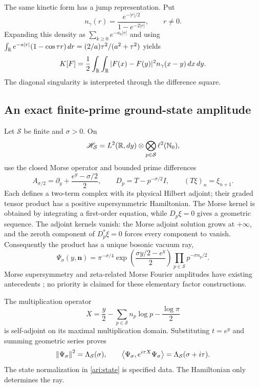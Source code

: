 The same kinetic form has a jump representation. Put
\[
n_\gamma(r)=\frac{e^{-|r|/2}}{1-e^{-2|r|}},\qquad r\ne0.
\]
Expanding this density as $\sum_{k\ge0}e^{-a_k|r|}$ and using
$\int_{\mathbb R}e^{-a|r|}(1-\cos\tau r)\,dr=(2/a)\tau^2/(a^2+\tau^2)$ yields
\begin{equation}\label{ari:gamma-jump}
K[F]=\frac12\int_{\mathbb R}\int_{\mathbb R}|F(x)-F(y)|^2n_\gamma(x-y)\,dx\,dy.
\end{equation}
The diagonal singularity is interpreted through the difference square.

\subsection{An exact finite-prime ground-state amplitude}
Let $\mathcal S$ be finite and $\sigma>0$. On
\[
\mathscr H_{\mathcal S}=L^2(\mathbb R,dy)\otimes
\bigotimes_{p\in\mathcal S}\ell^2(\mathbb N_0),
\]
use the closed Morse operator and bounded prime differences
\[
A_{\sigma/2}=\partial_y+\frac{e^y-\sigma/2}{2},\qquad
D_p=T-p^{-\sigma/2}I,\qquad (T\xi)_n=\xi_{n+1}.
\]
Each defines a two-term complex with its physical Hilbert adjoint; their graded tensor product has a positive supersymmetric Hamiltonian. The Morse kernel is obtained by integrating a first-order equation, while $D_p\xi=0$ gives a geometric sequence. The adjoint kernels vanish: the Morse adjoint solution grows at $+\infty$, and the zeroth component of $D_p^*\xi=0$ forces every component to vanish. Consequently the product has a unique bosonic vacuum ray,
\begin{equation}\label{ari:state}
\Psi_\sigma(y,\mathbf n)=\pi^{-\sigma/4}
\exp\!\left(\frac{\sigma y/2-e^y}{2}\right)
\prod_{p\in\mathcal S}p^{-\sigma n_p/2}.
\end{equation}
Morse supersymmetry and zeta-related Morse Fourier amplitudes have existing antecedents \cite{WittenMorse,McGuigan}; no priority is claimed for these elementary factor constructions.

The multiplication operator
\[
X=\frac y2-\sum_{p\in\mathcal S}n_p\log p-\frac{\log\pi}{2}
\]
is self-adjoint on its maximal multiplication domain. Substituting $t=e^y$ and summing geometric series proves
\begin{equation}\label{ari:matrix-coefficient}
\left\lVert\Psi_\sigma\right\rVert^2=\Lambda_{\mathcal S}(\sigma),\qquad
\left\langle\Psi_\sigma,e^{i\tau X}\Psi_\sigma\right\rangle
=\Lambda_{\mathcal S}(\sigma+i\tau).
\end{equation}
The state normalization in \eqref{ari:state} is specified data. The Hamiltonian only determines the ray.

